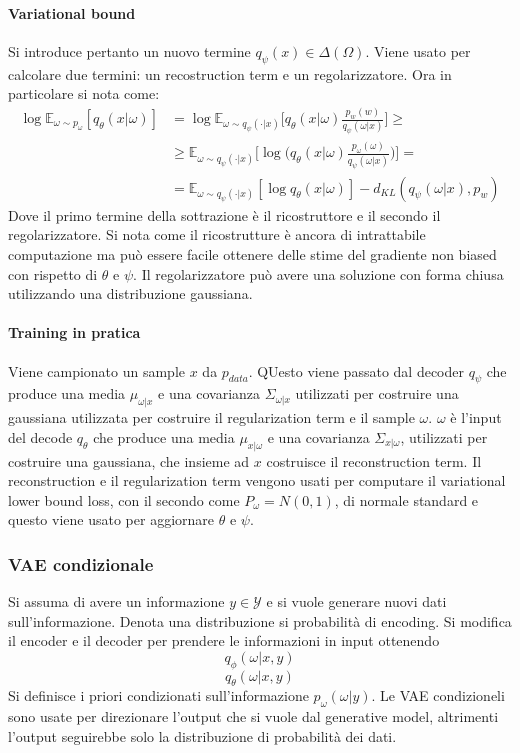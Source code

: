 			\paragraph{Variational bound}
			Si introduce pertanto un nuovo termine $q_\psi(x)\in\Delta(\Omega)$.
			Viene usato per calcolare due termini: un recostruction term e un regolarizzatore.
			Ora in particolare si nota come:
			\begin{align*}
				\log\mathbb{E}_{\omega\sim p_\omega} [q_\theta(x|\omega)] &= \log\mathbb{E}_{\omega\sim q_\psi(\cdot|x)}\bigl[q_\theta(x|\omega)\frac{p_w(w)}{q_\psi(\omega|x)}\bigr]\ge\\
																																	&\ge \mathbb{E}_{\omega\sim q_\psi(\cdot|x)}\bigl[\log\bigl(q_\theta(x|\omega)\frac{p_\omega(\omega)}{q_\psi(\omega|x)}\bigr)\bigr]=\\
																																	&=\mathbb{E}_{\omega\sim q_\psi(\cdot|x)}[\log q_\theta(x|\omega)] - d_{KL}(q_\psi(\omega|x), p_w)
			\end{align*}
			Dove il primo termine della sottrazione \`e il ricostruttore e il secondo il regolarizzatore.
			Si nota come il ricostrutture \`e ancora di intrattabile computazione ma pu\`o essere facile ottenere delle stime del gradiente non biased con rispetto di $\theta$ e $\psi$.
			Il regolarizzatore pu\`o avere una soluzione con forma chiusa utilizzando una distribuzione gaussiana.

			\paragraph{Training in pratica}
			Viene campionato un sample $x$ da $p_{data}$.
			QUesto viene passato dal decoder $q_\psi$ che produce una media $\mu_{\omega|x}$ e una covarianza $\Sigma_{\omega|x}$ utilizzati per costruire una gaussiana utilizzata per costruire il regularization term e il sample $\omega$.
			$\omega$ \`e l'input del decode $q_\theta$ che produce una media $\mu_{x|\omega}$ e una covarianza $\Sigma_{x|\omega}$, utilizzati per costruire una gaussiana, che insieme ad $x$ costruisce il reconstruction term.
			Il reconstruction e il regularization term vengono usati per computare il variational lower bound loss, con il secondo come $P_\omega = N(0,1)$, di normale standard e questo viene usato per aggiornare $\theta$ e $\psi$.

		\subsubsection{VAE condizionale}
		Si assuma di avere un informazione $y\in\mathcal{Y}$ e si vuole generare nuovi dati sull'informazione.
		Denota una distribuzione si probabilit\`a di encoding.
		Si modifica il encoder e il decoder per prendere le informazioni in input ottenendo
		$$q_\phi(\omega|x,y)$$
		$$q_\theta(\omega|x,y)$$
		Si definisce i priori condizionati sull'informazione $p_\omega(\omega|y)$.
		Le VAE condizioneli sono usate per direzionare l'output che si vuole dal generative model, altrimenti l'output seguirebbe solo la distribuzione di probabilit\`a dei dati.

